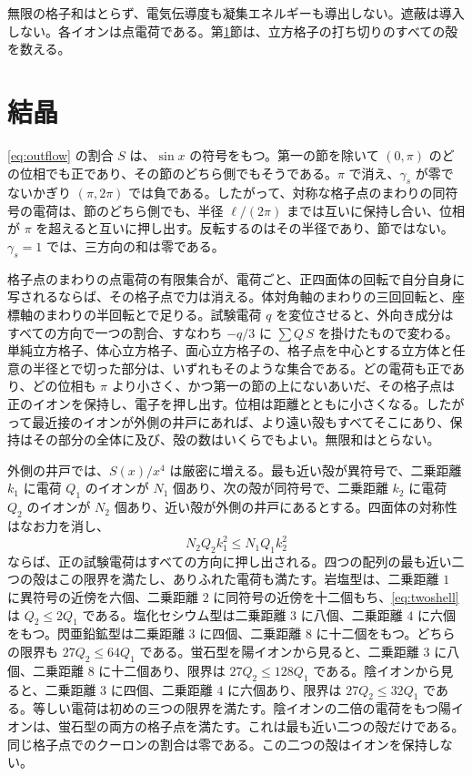 \documentclass[a4paper]{article}
\begin{document}
無限の格子和はとらず、電気伝導度も凝集エネルギーも導出しない。遮蔽は導入しない。各イオンは点電荷である。第\ref{sec:crystal}節は、立方格子の打ち切りのすべての殻を数える。

\section{結晶}
\label{sec:crystal}

\eqref{eq:outflow} の割合 \(S\) は、\(\sin x\) の符号をもつ。第一の節を除いて \((0,\pi)\) のどの位相でも正であり、その節のどちら側でもそうである。\(\pi\) で消え、\(\gamma_s\) が零でないかぎり \((\pi,2\pi)\) では負である。したがって、対称な格子点のまわりの同符号の電荷は、節のどちら側でも、半径 \(\ell/(2\pi)\) までは互いに保持し合い、位相が \(\pi\) を超えると互いに押し出す。反転するのはその半径であり、節ではない。\(\gamma_s=1\) では、三方向の和は零である。

格子点のまわりの点電荷の有限集合が、電荷ごと、正四面体の回転で自分自身に写されるならば、その格子点で力は消える。体対角軸のまわりの三回回転と、座標軸のまわりの半回転とで足りる。試験電荷 \(q\) を変位させると、外向き成分はすべての方向で一つの割合、すなわち \(-q/3\) に \(\sum Q\,S\) を掛けたもので変わる。単純立方格子、体心立方格子、面心立方格子の、格子点を中心とする立方体と任意の半径とで切った部分は、いずれもそのような集合である。どの電荷も正であり、どの位相も \(\pi\) より小さく、かつ第一の節の上にないあいだ、その格子点は正のイオンを保持し、電子を押し出す。位相は距離とともに小さくなる。したがって最近接のイオンが外側の井戸にあれば、より遠い殻もすべてそこにあり、保持はその部分の全体に及び、殻の数はいくらでもよい。無限和はとらない。

外側の井戸では、\(S(x)/x^{4}\) は厳密に増える。最も近い殻が異符号で、二乗距離 \(k_{1}\) に電荷 \(Q_{1}\) のイオンが \(N_{1}\) 個あり、次の殻が同符号で、二乗距離 \(k_{2}\) に電荷 \(Q_{2}\) のイオンが \(N_{2}\) 個あり、近い殻が外側の井戸にあるとする。四面体の対称性はなお力を消し、
\begin{equation}
\label{eq:twoshell}
N_{2}Q_{2}k_{1}^{2}\le N_{1}Q_{1}k_{2}^{2}
\end{equation}
ならば、正の試験電荷はすべての方向に押し出される。四つの配列の最も近い二つの殻はこの限界を満たし、ありふれた電荷も満たす。岩塩型は、二乗距離 \(1\) に異符号の近傍を六個、二乗距離 \(2\) に同符号の近傍を十二個もち、\eqref{eq:twoshell} は \(Q_{2}\le 2Q_{1}\) である。塩化セシウム型は二乗距離 \(3\) に八個、二乗距離 \(4\) に六個をもつ。閃亜鉛鉱型は二乗距離 \(3\) に四個、二乗距離 \(8\) に十二個をもつ。どちらの限界も \(27Q_{2}\le 64Q_{1}\) である。蛍石型を陽イオンから見ると、二乗距離 \(3\) に八個、二乗距離 \(8\) に十二個あり、限界は \(27Q_{2}\le 128Q_{1}\) である。陰イオンから見ると、二乗距離 \(3\) に四個、二乗距離 \(4\) に六個あり、限界は \(27Q_{2}\le 32Q_{1}\) である。等しい電荷は初めの三つの限界を満たす。陰イオンの二倍の電荷をもつ陽イオンは、蛍石型の両方の格子点を満たす。これは最も近い二つの殻だけである。同じ格子点でのクーロンの割合は零である。この二つの殻はイオンを保持しない。
\end{document}
